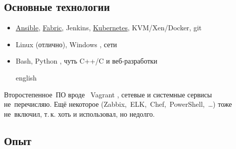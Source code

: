 \documentclass[11pt, a4paper]{article}
\newcommand{\Delimitline}{
  \vspace{-2ex}
  \noindent\makebox[\linewidth]{\rule{\DelimitlineLength}{0.12ex}} }
\newcommand\Eng[1]{%
  \foreignlanguage{english}{#1}%
}
\let\it\textit
\newcommand{\forceindent}{\leavevmode{\parindent=1.5em\indent}}
\begin{document}
\subsection*{{Основные технологии}}
\Delimitline

\begin{itemize}
  \item \href{https://github.com/bititanb/ansible-taskmngr}{Ansible}, \href{https://bitbucket.org/bititanb/ivd-fabric/src}{Fabric}, Jenkins, \href{https://github.com/bititanb/ansible-taskmngr/tree/master/roles/taskmngr-kubernetes/templates}{Kubernetes}, KVM/Xen/Docker, git
  \item \Eng{Linux} (отлично), \Eng{Windows}, сети
  \item \Eng{Bash, Python}, чуть \Eng{C++/C} и веб-разработки
  \begin{otherlanguage*}{english}
  \end{otherlanguage*}
\end{itemize}

\forceindent Второстепенное~ПО вроде~\Eng{Vagrant}, сетевые и системные сервисы не~перечисляю.
Ещё некоторое \Eng{(Zabbix,~ELK,~Chef,~PowerShell,~\dots)} тоже не~включил, т.\,к. хоть и использовал, но недолго.

\subsection*{{Опыт}}
\Delimitline

\begin{spacing}{0.8}
\end{spacing}
\end{document}
